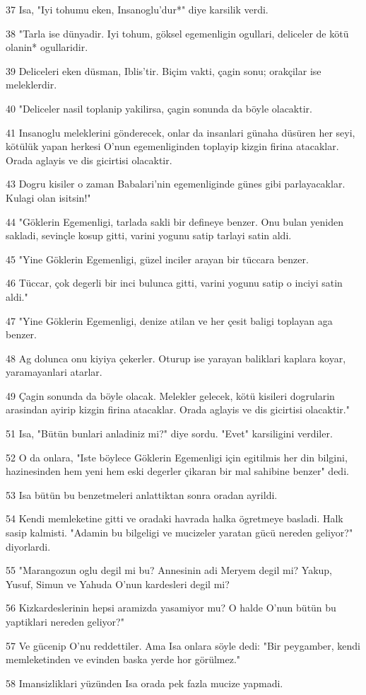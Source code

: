 \par 37 Isa, "Iyi tohumu eken, Insanoglu'dur*" diye karsilik verdi.
\par 38 "Tarla ise dünyadir. Iyi tohum, göksel egemenligin ogullari, deliceler de kötü olanin* ogullaridir.
\par 39 Deliceleri eken düsman, Iblis'tir. Biçim vakti, çagin sonu; orakçilar ise meleklerdir.
\par 40 "Deliceler nasil toplanip yakilirsa, çagin sonunda da böyle olacaktir.
\par 41 Insanoglu meleklerini gönderecek, onlar da insanlari günaha düsüren her seyi, kötülük yapan herkesi O'nun egemenliginden toplayip kizgin firina atacaklar. Orada aglayis ve dis gicirtisi olacaktir.
\par 43 Dogru kisiler o zaman Babalari'nin egemenliginde günes gibi parlayacaklar. Kulagi olan isitsin!"
\par 44 "Göklerin Egemenligi, tarlada sakli bir defineye benzer. Onu bulan yeniden sakladi, sevinçle kosup gitti, varini yogunu satip tarlayi satin aldi.
\par 45 "Yine Göklerin Egemenligi, güzel inciler arayan bir tüccara benzer.
\par 46 Tüccar, çok degerli bir inci bulunca gitti, varini yogunu satip o inciyi satin aldi."
\par 47 "Yine Göklerin Egemenligi, denize atilan ve her çesit baligi toplayan aga benzer.
\par 48 Ag dolunca onu kiyiya çekerler. Oturup ise yarayan baliklari kaplara koyar, yaramayanlari atarlar.
\par 49 Çagin sonunda da böyle olacak. Melekler gelecek, kötü kisileri dogrularin arasindan ayirip kizgin firina atacaklar. Orada aglayis ve dis gicirtisi olacaktir."
\par 51 Isa, "Bütün bunlari anladiniz mi?" diye sordu. "Evet" karsiligini verdiler.
\par 52 O da onlara, "Iste böylece Göklerin Egemenligi için egitilmis her din bilgini, hazinesinden hem yeni hem eski degerler çikaran bir mal sahibine benzer" dedi.
\par 53 Isa bütün bu benzetmeleri anlattiktan sonra oradan ayrildi.
\par 54 Kendi memleketine gitti ve oradaki havrada halka ögretmeye basladi. Halk sasip kalmisti. "Adamin bu bilgeligi ve mucizeler yaratan gücü nereden geliyor?" diyorlardi.
\par 55 "Marangozun oglu degil mi bu? Annesinin adi Meryem degil mi? Yakup, Yusuf, Simun ve Yahuda O'nun kardesleri degil mi?
\par 56 Kizkardeslerinin hepsi aramizda yasamiyor mu? O halde O'nun bütün bu yaptiklari nereden geliyor?"
\par 57 Ve gücenip O'nu reddettiler. Ama Isa onlara söyle dedi: "Bir peygamber, kendi memleketinden ve evinden baska yerde hor görülmez."
\par 58 Imansizliklari yüzünden Isa orada pek fazla mucize yapmadi.

